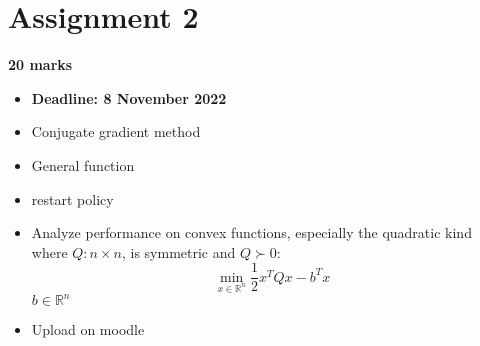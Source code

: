 \documentclass[12pt]{article}
\author{Assignment 2}
\date{}
\title{}
\begin{document}
\section*{Assignment 2}
\hfill \textbf{20 marks}
\begin{itemize}
    \item \textbf{Deadline: 8 November 2022}
    \item Conjugate gradient method
    \item General function
    \item restart policy
    \item Analyze performance on convex functions, especially the quadratic kind
        where \hbox{\(Q:n\times n\)}, is symmetric and $Q\succ 0$:
        \[\min_{x\in\mathbb{R}^n}\dfrac{1}{2}x^TQx-b^Tx\]
        $b\in\mathbb{R}^n$
    \item Upload on moodle
\end{itemize}
\end{document}
